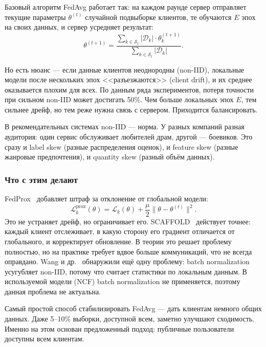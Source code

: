 \documentclass[14pt,a4paper]{extarticle}
\begin{document}
Базовый алгоритм FedAvg работает так: на каждом раунде сервер отправляет текущие параметры $\theta^{(t)}$ случайной подвыборке клиентов, те обучаются $E$ эпох на своих данных, и сервер усредняет результат:
\begin{equation}
\theta^{(t+1)} = \frac{\sum_{k \in \mathcal{S}_t} |\mathcal{D}_k| \cdot \theta_k^{(t+1)}}{\sum_{k \in \mathcal{S}_t} |\mathcal{D}_k|}.
\end{equation}

Но есть нюанс --- если данные клиентов неоднородны (non-IID), локальные модели после нескольких эпох <<разъезжаются>> (client drift), и их среднее оказывается плохим для всех. По данным ряда экспериментов, потеря точности при сильном non-IID может достигать 50\%. Чем больше локальных эпох $E$, тем сильнее дрейф, но тем реже нужна связь с сервером. Приходится балансировать.

В рекомендательных системах non-IID --- норма. У разных компаний разная аудитория: один сервис обслуживает любителей драм, другой --- боевиков. Это сразу и label skew (разные распределения оценок), и feature skew (разные жанровые предпочтения), и quantity skew (разный объём данных).

\subsubsection{Что с этим делают}

FedProx~\cite{li2020federated} добавляет штраф за отклонение от глобальной модели:
\begin{equation}
\mathcal{L}_k^{\text{prox}}(\theta) = \mathcal{L}_k(\theta) + \frac{\mu}{2}\|\theta - \theta^{(t)}\|^2.
\end{equation}
Это не устраняет дрейф, но ограничивает его. SCAFFOLD~\cite{karimireddy2020scaffold} действует точнее: каждый клиент отслеживает, в какую сторону его градиент отличается от глобального, и корректирует обновление. В теории это решает проблему полностью, но на практике требует вдвое больше коммуникаций, что не всегда оправдано. Wang и др.~\cite{wang2020tackling} обнаружили ещё одну проблему: batch normalization усугубляет non-IID, потому что считает статистики по локальным данным. В используемой модели (NCF) batch normalization не применяется, поэтому данная проблема не актуальна.

Самый простой способ стабилизировать FedAvg --- дать клиентам немного общих данных. Даже 5--10\% выборки, доступной всем, заметно улучшают сходимость. Именно на этом основан предложенный подход: публичные пользователи доступны всем клиентам.
\end{document}
